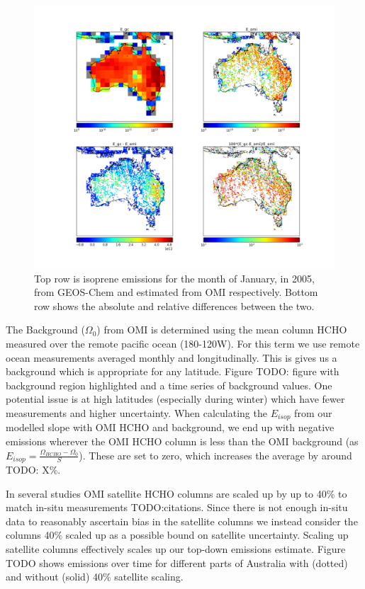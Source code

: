     \begin{figure}
      \includegraphics[width=\textwidth]{Figures/Isoprene/E_Comparison.png}
      \caption{%
        Top row is isoprene emissions for the month of January, in 2005, from GEOS-Chem and estimated from OMI respectively.
        Bottom row shows the absolute and relative differences between the two.
      }
      \label{BioIsop:Calculation:fig_E_isop_200501}
    \end{figure}
    
    The Background ($\Omega_0$) from OMI is determined using the mean column HCHO measured over the remote pacific ocean (180-120{\degr}W).
    For this term we use remote ocean measurements averaged monthly and longitudinally.
    This is gives us a background which is appropriate for any latitude.
    Figure TODO: figure with background region highlighted and a time series of background values.
    One potential issue is at high latitudes (especially during winter) which have fewer measurements and higher uncertainty.
    When calculating the $E_{isop}$ from our modelled slope with OMI HCHO and background, we end up with negative emissions wherever the OMI HCHO column is less than the OMI background (as $E_{isop} = \frac{\Omega_{HCHO} - \Omega_0}{S}$).
    These are set to zero, which increases the average by around TODO: X\%.
    
    In several studies OMI satellite HCHO columns are scaled up by up to 40\% to match in-situ measurements TODO:citations.
    Since there is not enough in-situ data to reasonably ascertain bias in the satellite columns we instead consider the columns 40\% scaled up as a possible bound on satellite uncertainty.
    Scaling up satellite columns effectively scales up our top-down emissions estimate. 
    Figure TODO shows emissions over time for different parts of Australia with (dotted) and without (solid) 40\% satellite scaling.
  

